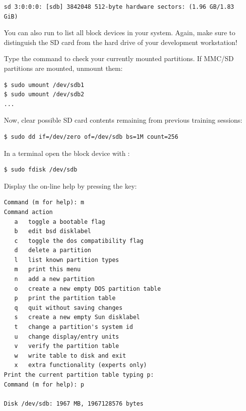 \begin{verbatim}
sd 3:0:0:0: [sdb] 3842048 512-byte hardware sectors: (1.96 GB/1.83 GiB)
\end{verbatim}



You can also run  to list all block devices
in your system. Again, make sure to distinguish the SD card from the
hard drive of your development workstation!

Type the  command to check your currently mounted
partitions. If MMC/SD partitions are mounted, unmount them:

\begin{verbatim}
$ sudo umount /dev/sdb1
$ sudo umount /dev/sdb2
...
\end{verbatim}

Now, clear possible SD card contents remaining from previous training 
sessions:

\begin{verbatim}
$ sudo dd if=/dev/zero of=/dev/sdb bs=1M count=256
\end{verbatim}

In a terminal open the block device with :

\begin{verbatim}
$ sudo fdisk /dev/sdb
\end{verbatim}

Display the on-line help by pressing the  key:

\begin{verbatim}
Command (m for help): m 
Command action 
   a   toggle a bootable flag 
   b   edit bsd disklabel 
   c   toggle the dos compatibility flag 
   d   delete a partition 
   l   list known partition types 
   m   print this menu 
   n   add a new partition 
   o   create a new empty DOS partition table 
   p   print the partition table 
   q   quit without saving changes 
   s   create a new empty Sun disklabel 
   t   change a partition's system id 
   u   change display/entry units 
   v   verify the partition table 
   w   write table to disk and exit 
   x   extra functionality (experts only)
Print the current partition table typing p:
Command (m for help): p 

Disk /dev/sdb: 1967 MB, 1967128576 bytes
\end{verbatim}

